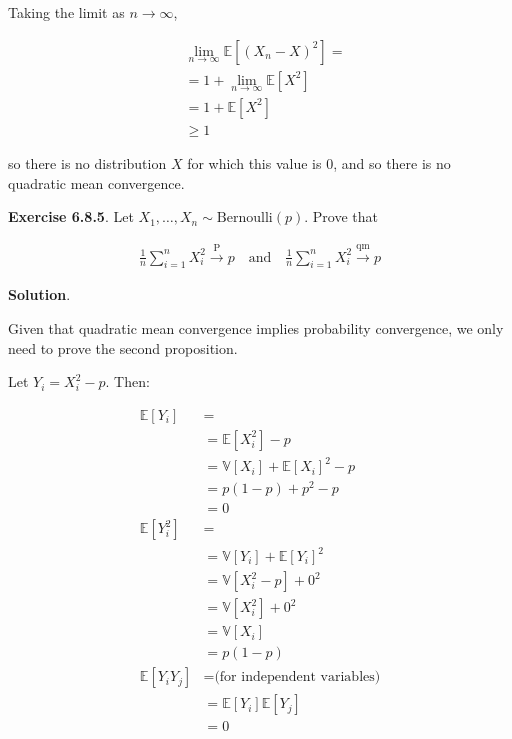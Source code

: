 Taking the limit as \(n \rightarrow \infty\),

\begin{align*}
& \lim _{n \rightarrow \infty} \mathbb{E}\left[(X_{n} - X)^{2}\right] = \\
& = 1 + \lim _{n \rightarrow \infty} \mathbb{E}\left[X^{2}\right] \\
& = 1 + \mathbb{E}\left[X^{2}\right] \\
& \geq 1
\end{align*}

so there is no distribution \(X\) for which this value is 0, and so
there is no quadratic mean convergence.

\textbf{Exercise 6.8.5}. Let
\(X_{1}, \dots, X_{n} \sim \text{Bernoulli}(p)\). Prove that

\begin{align*}\frac{1}{n} \sum_{i=1}^{n} X_{i}^{2} \xrightarrow{\text{P}} p
\quad\mathrm{and}\quad 
\frac{1}{n} \sum_{i=1}^{n} X_{i}^{2} \xrightarrow{\text{qm}} p
\end{align*}

\textbf{Solution}.

Given that quadratic mean convergence implies probability convergence,
we only need to prove the second proposition.

Let \(Y_{i} = X_{i}^{2} - p\). Then:

\begin{align*}
\mathbb{E}[Y_{i}] & = \\
& = \mathbb{E}[X_{i}^{2}] - p \\
& = \mathbb{V}[X_{i}] + \mathbb{E}[X_{i}]^{2} - p \\
& = p(1-p) + p^{2} - p \\
& = 0 \\
\mathbb{E}[Y_{i}^{2}] & = \\
& = \mathbb{V}[Y_{i}] + \mathbb{E}[Y_{i}]^{2} \\
& = \mathbb{V}[X_{i}^{2} - p] + 0^{2} \\
& = \mathbb{V}[X_{i}^{2}] + 0^{2} \\
& = \mathbb{V}[X_{i}]\\
& = p(1-p) \\
\mathbb{E}[Y_{i} Y_{j}] & = \text{(for independent variables)}\\
& = \mathbb{E}[Y_{i}] \mathbb{E}[Y_{j}] \\
& = 0
\end{align*}

